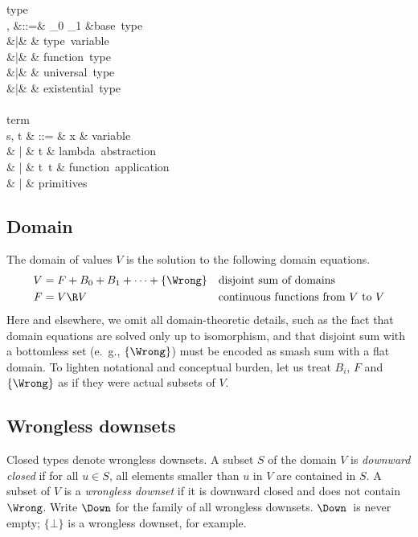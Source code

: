 \documentclass{amsart}
\theoremstyle{definition}
\begin{document}
\begin{syntax}
\mbox{type}\\
\sigma, \tau
&::=& \iota_0 \Or \iota_1 \Or \cdots &\mbox{base type}\\
&|& \alpha \Or \beta \Or \cdots & \mbox{type variable} \\
&|& \tau \rightarrow \tau & \mbox{function type} \\
&|& \All\alpha\tau & \mbox{universal type} \\
&|& \Ex\alpha\tau & \mbox{existential type}
\\
\\
\mbox{term}\\
s, t & ::= & x & \mbox{variable} \\
& | & t  & \mbox{lambda abstraction} \\
& | & t~t & \mbox{function application} \\
& | & \mbox{primitives}
\end{syntax}

\subsection{Domain}
The domain of values $V$ is the solution to the following domain
equations.
\begin{align*}
V &= F + B_0 + B_1 + \cdots + \{\Wrong\}
  &&\mbox{disjoint sum of domains}\\
F &= V \R V &&\mbox{continuous functions from $V$ to $V$}
\end{align*}
Here and elsewhere, we omit all domain-theoretic details, such as
the fact that domain equations are solved only up to isomorphism,
and that disjoint sum with a bottomless set (e.~g., $\{\Wrong\}$)
must be encoded as smash sum with a flat domain. To lighten
notational and conceptual burden, let us treat $B_i$, $F$ and
$\{\Wrong\}$ as if they were actual subsets of $V$.

\subsection{Wrongless downsets}
\label{wrongless}
Closed types denote wrongless downsets. A subset $S$ of the
domain $V$ is \emph{downward closed} if for all $u\in S$, all
elements smaller than $u$ in $V$ are contained in $S$. A subset
of $V$ is a \emph{wrongless downset} if it is downward closed and
does not contain $\Wrong$. Write $\Down$ for the family of all
wrongless downsets. $\Down$~is never empty; $\{\bot\}$ is a
wrongless downset, for example.
\end{document}
